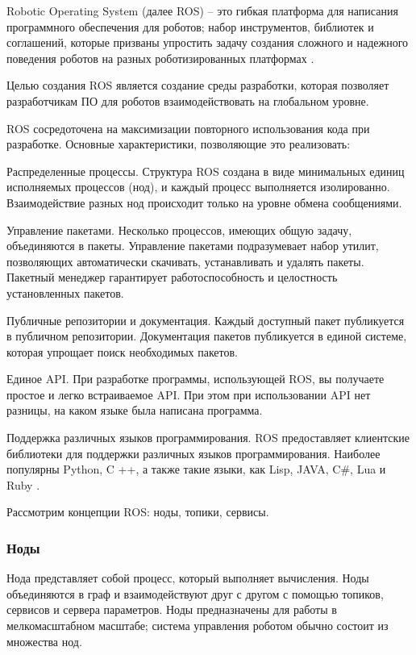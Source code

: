 Robotic Operating System (далее ROS) -- это гибкая платформа для написания программного обеспечения для роботов; набор инструментов, библиотек и соглашений, которые призваны упростить задачу создания сложного и надежного поведения роботов на разных роботизированных платформах \cite{ros}.

Целью создания ROS является создание среды разработки, которая позволяет разработчикам ПО для роботов взаимодействовать на глобальном уровне.

ROS сосредоточена на максимизации повторного использования кода при разработке. Основные характеристики, позволяющие это реализовать:

Распределенные процессы. Структура ROS создана в виде минимальных единиц исполняемых процессов (нод), и каждый процесс выполняется изолированно. Взаимодействие разных нод происходит только на уровне обмена сообщениями.

Управление пакетами. Несколько процессов, имеющих общую задачу, объединяются в пакеты. Управление пакетами подразумевает набор утилит, позволяющих автоматически скачивать, устанавливать и удалять пакеты. Пакетный менеджер гарантирует работоспособность и целостность установленных пакетов.

Публичные репозитории и документация. Каждый доступный пакет публикуется в публичном репозитории. Документация пакетов публикуется в единой системе, которая упрощает поиск необходимых пакетов.

Единое API. При разработке программы, использующей ROS, вы получаете простое и легко встраиваемое API. При этом при использовании API нет разницы, на каком языке была написана программа.

Поддержка различных языков программирования. ROS предоставляет клиентские библиотеки для поддержки различных языков программирования. Наиболее популярны Python, C ++, а также такие языки, как Lisp, JAVA, C\#, Lua и Ruby \cite{voltbro}.

Рассмотрим концепции ROS: ноды, топики, сервисы.

\subsubsection{Ноды}
Нода представляет собой процесс, который выполняет вычисления. Ноды объединяются в граф и взаимодействуют друг с другом с помощью топиков, сервисов и сервера параметров. Ноды предназначены для работы в мелкомасштабном масштабе; система управления роботом обычно состоит из множества нод.

